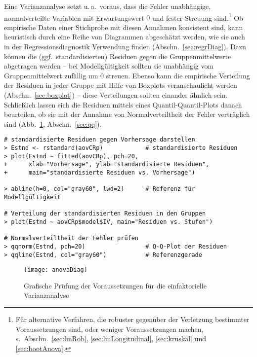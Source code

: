 Eine Varianzanalyse setzt u.\,a.\ voraus, dass die Fehler unabhängige, normalverteilte Variablen mit Erwartungswert $0$ und fester Streuung sind.\footnote{Für alternative Verfahren, die robuster gegenüber der Verletzung bestimmter Voraussetzungen sind, oder weniger Voraussetzungen machen, s.\ Abschn.\ \ref{sec:lmRob}, \ref{sec:lmLongitudinal}, \ref{sec:kruskal} und \ref{sec:bootAnova}.} Ob empirische Daten einer Stichprobe mit diesen Annahmen konsistent sind, kann heuristisch durch eine Reihe von Diagrammen abgeschätzt werden, wie sie auch in der Regressionsdiagnostik Verwendung finden (Abschn.\ \ref{sec:regrDiag}). Dazu können die (ggf.\ standardisierten) Residuen gegen die Gruppenmittelwerte abgetragen werden -- bei Modellgültigkeit sollten sie unabhängig vom Gruppenmittelwert zufällig um $0$ streuen. Ebenso kann die empirische Verteilung der Residuen in jeder Gruppe mit Hilfe von Boxplots veranschaulicht werden (Abschn.\ \ref{sec:boxplot}) -- diese Verteilungen sollten einander ähnlich sein. Schließlich lassen sich die Residuen mittels eines Quantil-Quantil-Plots danach beurteilen, ob sie mit der Annahme von Normalverteiltheit der Fehler verträglich sind (Abb.\ \ref{fig:anovaDiag}, Abschn.\ \ref{sec:qq}).
\begin{lstlisting}
# standardisierte Residuen gegen Vorhersage darstellen
> Estnd <- rstandard(aovCRp)            # standardisierte Residuen
> plot(Estnd ~ fitted(aovCRp), pch=20,
+      xlab="Vorhersage", ylab="standardisierte Residuen",
+      main="standardisierte Residuen vs. Vorhersage")

> abline(h=0, col="gray60", lwd=2)      # Referenz für Modellgültigkeit

# Verteilung der standardisierten Residuen in den Gruppen
> plot(Estnd ~ aovCRp$model$IV, main="Residuen vs. Stufen")

# Normalverteiltheit der Fehler prüfen
> qqnorm(Estnd, pch=20)                 # Q-Q-Plot der Residuen
> qqline(Estnd, col="gray60")           # Referenzgerade
\end{lstlisting}

\begin{figure}[ht]
\centering
\texttt{[image: anovaDiag]}
\vspace*{-0.5em}
\caption{Grafische Prüfung der Voraussetzungen für die einfaktorielle Varianzanalyse}
\label{fig:anovaDiag}
\end{figure}


